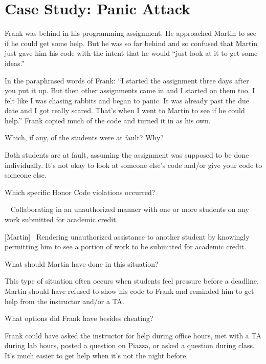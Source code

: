 \section*{Case Study: Panic Attack}

Frank was behind in his programming assignment.
He approached Martin to see if he could get some help.
But he was so far behind and so confused that Martin just gave him his code with the intent that he would ``just look at it to get some ideas.''

\vspace{1em}

In the paraphrased words of Frank: ``I started the assignment three days after you put it up.
But then other assignments came in and I started on them too.
I felt like I was chasing rabbits and began to panic.
It was already past the due date and I got really scared.
That's when I went to Martin to see if he could help.''
Frank copied much of the code and turned it in as his own.




\Q Which, if any, of the students were at fault? Why?

\begin{answer}[6em]
Both students are at fault, assuming the assignment was supposed to be done individually.
It's not okay to look at someone else's code and/or give your code to someone else.
\end{answer}


\Q Which specific Honor Code violations occurred?

\begin{answer}[8em]
[Frank]~ Collaborating in an unauthorized manner with one or more students on any work submitted for academic credit.

\bigskip

[Martin]~ Rendering unauthorized assistance to another student by knowingly permitting him to see a portion of work to be submitted for academic credit.
\end{answer}


\Q What should Martin have done in this situation?

\begin{answer}[6em]
This type of situation often occurs when students feel pressure before a deadline.
Martin should have refused to show his code to Frank and reminded him to get help from the instructor and/or a TA.
\end{answer}


\Q What options did Frank have besides cheating?

\begin{answer}[6em]
Frank could have asked the instructor for help during office hours, met with a TA during lab hours, posted a question on Piazza, or asked a question during class.
It's much easier to get help when it's not the night before.
\end{answer}

